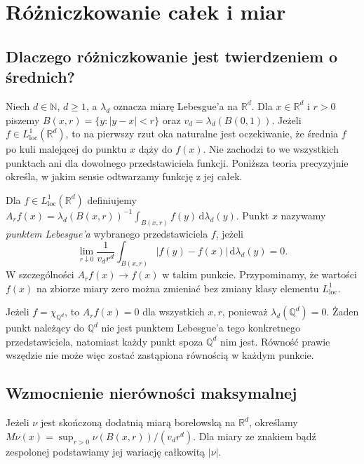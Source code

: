 \chapter{Różniczkowanie całek i miar}
\label{ch:differentiation-25}

\providecommand{\atlasref}[2]{#2}


\section{Dlaczego różniczkowanie jest twierdzeniem o średnich?}
Niech $d\in\mathbb N$, $d\ge1$, a $\lambda_d$ oznacza miarę Lebesgue'a na
$\mathbb R^d$. Dla $x\in\mathbb R^d$ i $r>0$ piszemy
$B(x,r)=\{y:|y-x|<r\}$ oraz $v_d=\lambda_d(B(0,1))$.
Jeżeli $f\in L^1_{\mathrm{loc}}(\mathbb R^d)$, to na pierwszy
rzut oka naturalne jest oczekiwanie, że średnia $f$ po kuli
malejącej do punktu $x$ dąży do $f(x)$. Nie zachodzi to
we wszystkich punktach ani dla dowolnego przedstawiciela
funkcji. Poniższa teoria precyzyjnie określa, w jakim
sensie odtwarzamy funkcję z jej całek.

\begin{definicja}
\label{def:lebesgue-point-25}
Dla $f\in L^1_{\mathrm{loc}}(\mathbb R^d)$ definiujemy
$A_rf(x)=\lambda_d(B(x,r))^{-1}\int_{B(x,r)}f(y)\,\mathrm d\lambda_d(y)$.
Punkt $x$ nazywamy \emph{punktem Lebesgue'a} wybranego
przedstawiciela $f$, jeżeli
\begin{equation}\label{eq:lebesgue-point-25}
 \lim_{r\downarrow0}\frac1{v_dr^d}
 \int_{B(x,r)}|f(y)-f(x)|\,\mathrm d\lambda_d(y)=0.
\end{equation}
W szczególności $A_rf(x)\to f(x)$ w takim punkcie.
Przypominamy, że wartości $f(x)$ na zbiorze miary zero
można zmieniać bez zmiany klasy elementu $L^1_{\mathrm{loc}}$.
\end{definicja}

\begin{przyklad}
Jeżeli $f=\chi_{\mathbb Q^d}$, to $A_rf(x)=0$ dla
wszystkich $x,r$, ponieważ $\lambda_d(\mathbb Q^d)=0$.
Żaden punkt należący do $\mathbb Q^d$ nie jest punktem Lebesgue'a
tego konkretnego przedstawiciela, natomiast każdy punkt spoza
$\mathbb Q^d$ nim jest.
Równość prawie wszędzie nie może więc zostać zastąpiona
równością w każdym punkcie.
\end{przyklad}

\section{Wzmocnienie nierówności maksymalnej}
\begin{definicja}
\label{def:max-measure-25}
Jeżeli $\nu$ jest skończoną dodatnią miarą borelowską
na $\mathbb R^d$, określamy
$M\nu(x)=\sup_{r>0}\nu(B(x,r))/(v_dr^d)$.
Dla miary ze znakiem bądź zespolonej podstawiamy jej
wariację całkowitą $|\nu|$.
\end{definicja}

